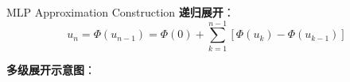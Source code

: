 \documentclass[aspectratio=169]{beamer}
\begin{document}
	\begin{frame}{MLP Approximation Construction}
		\textbf{递归展开}：
		\[
		u_n = \Phi(u_{n-1}) = \Phi(0) + \sum_{k=1}^{n-1} [\Phi(u_k) - \Phi(u_{k-1})]
		\]

		\textbf{多级展开示意图}：
	\end{frame}
	\fi

	\iffalse
	\section{数学公式解析}
	\begin{frame}{关键数学公式解析}
		\begin{itemize}
			\item \textbf{Hamilton-Jacobi-Bellman (HJB) 方程:}
				\begin{equation*}
				\frac{\partial u}{\partial t}+H(x,\nabla u)=0.
				\end{equation*}
				描述最优控制问题中价值函数的动态规划原理
			\item \textbf{Black-Scholes 方程:}
				\begin{equation*}
				\frac{\partial u}{\partial t}+\frac{1}{2}\sigma^2 \sum_{i=1}^{d}x_i^2 \frac{\partial^2 u}{\partial x_i^2}+r\langle \nabla u,x\rangle-ru+f(u)=0.
				\end{equation*}
				用于金融衍生品定价，考虑违约风险、交易成本等非线性效应
			\item \textbf{蒙特卡罗积分:}
				\begin{equation*}
				I(g)=\int_{[0,1]^d}g(x)dx,\quad I_n(g)=\frac{1}{n}\sum_{j=1}^n g(x_j),
				\end{equation*}
				误差分析：
				\begin{equation*}
				\mathbb{E}\Bigl[|I(g)-I_n(g)|^2\Bigr]=\frac{\mathrm{Var}(g)}{n}.
				\end{equation*}
			\item \textbf{神经网络近似表达式:}
				\begin{equation*}
				f_m(x,\theta)=\frac{1}{m}\sum_{j=1}^{m}a_j\,\sigma\bigl(\langle w_j,x\rangle\bigr),
				\end{equation*}
				以及 ResNet 形式：
				\begin{equation*}
				z_{l+1}=z_l+\frac{1}{L}\sum_{j=1}^{M}a_{j,l}\,\sigma\bigl(\langle z_l,w_{j,l}\rangle\bigr).
				\end{equation*}
		\end{itemize}
	\end{frame}
	\fi
\end{document}
